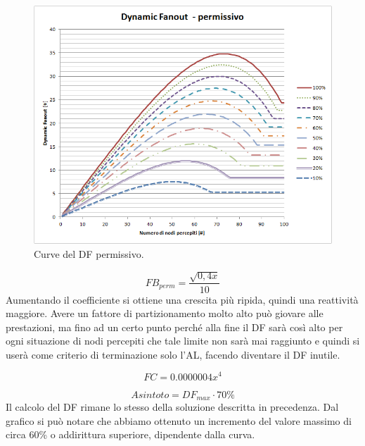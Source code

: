 \begin{figure}[t]
	\centering
	\includegraphics[width=0.9\linewidth]{Images/grafici_usati/DF_permissivo_tot_no_arr}
	\caption[Curve del DF permissivo]{Curve del DF permissivo.}
	\label{fig:DF_permissivo_tot_no_arr}
\end{figure}

\begin{equation}
	FB_{perm}=\dfrac{\sqrt{0,4x}}{10}\nonumber
\end{equation}
Aumentando il coefficiente si ottiene una crescita più ripida, quindi una reattività maggiore. Avere un fattore di partizionamento molto alto può giovare alle prestazioni, ma fino ad un certo punto perché alla fine il DF sarà così alto per ogni situazione di nodi percepiti che tale limite non sarà mai raggiunto e quindi si userà come criterio di terminazione solo l'AL, facendo diventare il DF inutile.
\medskip

\begin{equation}
	FC = 0.0000004x^4 \nonumber
\end{equation}

\begin{equation}
	\label{eq:df_asintoto_perm}
	Asintoto = DF_{max}\cdot 70\%
\end{equation}
Il calcolo del DF rimane lo stesso della soluzione descritta in precedenza. Dal grafico si può notare che abbiamo ottenuto un incremento del valore massimo di circa 60\% o addirittura superiore, dipendente dalla curva.
\bigskip

